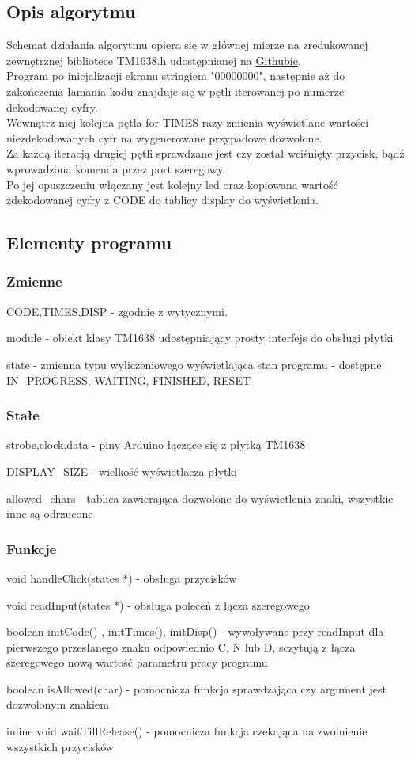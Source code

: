 \documentclass[a4paper,12pt]{article}
\begin{document}
\subsection{Opis algorytmu}
Schemat działania algorytmu opiera się w głównej mierze na zredukowanej zewnętrznej bibliotece TM1638.h udostępnianej na \href{https://github.com/rjbatista/tm1638-library}{Githubie}. \\
Program po inicjalizacji ekranu stringiem "00000000", następnie aż do zakończenia łamania kodu znajduje się w pętli iterowanej po numerze dekodowanej cyfry.\\
Wewnątrz niej kolejna pętla for TIMES razy zmienia wyświetlane wartości niezdekodowanych cyfr na wygenerowane przypadowe dozwolone.\\
Za każdą iteracją drugiej pętli sprawdzane jest czy został wciśnięty przycisk, bądź wprowadzona komenda przez port szeregowy.\\
Po jej opuszczeniu włączany jest kolejny led oraz kopiowana wartość zdekodowanej cyfry z CODE do tablicy display do wyświetlenia.
\subsection{Elementy programu}

\subsubsection{Zmienne}
\par CODE,TIMES,DISP - zgodnie z wytycznymi.
\par module - obiekt klasy TM1638 udostępniający prosty interfejs do obsługi płytki
\par state - zmienna typu wyliczeniowego wyświetlająca stan programu - dostępne IN\_PROGRESS, WAITING, FINISHED, RESET
\subsubsection{Stałe}
\par strobe,clock,data - piny Arduino łączące się z płytką TM1638
\par DISPLAY\_SIZE - wielkość wyświetlacza płytki
\par allowed\_chars - tablica zawierająca dozwolone do wyświetlenia znaki, wszystkie inne są odrzucone
\subsubsection{Funkcje}
\par void handleClick(states *) - obsługa przycisków
\par void readInput(states *) - obsługa poleceń z łącza szeregowego
\par boolean initCode() , initTimes(), initDisp() - wywoływane przy readInput dla pierwszego przesłanego znaku odpowiednio C, N lub D, sczytują z łącza szeregowego nową wartość parametru pracy programu
\par boolean isAllowed(char) - pomocnicza funkcja sprawdzająca czy argument jest dozwolonym znakiem
\par inline void waitTillRelease() - pomocnicza funkcja czekająca na zwolnienie wszystkich przycisków
\end{document}

